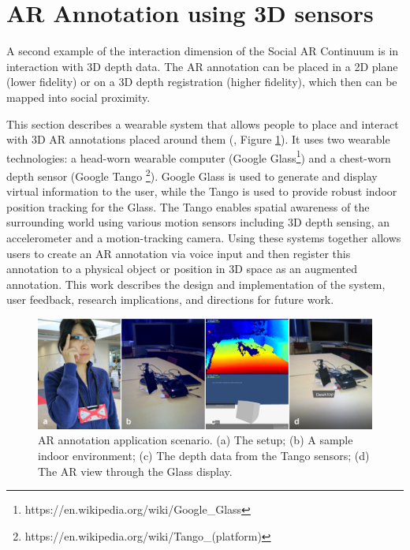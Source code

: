 \pagebreak
\section{AR Annotation using 3D sensors}
\label{sec:3D}

A second example of the interaction dimension of the Social AR Continuum is in interaction with 3D depth data. The AR annotation can be placed in a 2D plane (lower fidelity) or on a 3D depth registration (higher fidelity), which then can be mapped into social proximity. 

This section describes a wearable system that allows people to place and interact with 3D AR annotations placed around them (\cite{Nassani2015a, Nassani2015}, Figure \ref{fig:mgia15:teaser}). It uses two wearable technologies: a head-worn wearable computer (Google Glass\footnote{https://en.wikipedia.org/wiki/Google_Glass}) and a chest-worn depth sensor (Google Tango \footnote{https://en.wikipedia.org/wiki/Tango_(platform)}). Google Glass is used to generate and display virtual information to the user, while the Tango is used to provide robust indoor position tracking for the Glass. The Tango enables spatial awareness of the surrounding world using various motion sensors including 3D depth sensing, an accelerometer and a motion-tracking camera. Using these systems together allows users to create an AR annotation via voice input and then register this annotation to a physical object or position in 3D space as an augmented annotation. This work describes the design and implementation of the system, user feedback, research implications, and directions for future work.  

\begin{figure}[ht]
  \centering
  \includegraphics[width=\linewidth]{images/62-3d-mgia15/sampleteaser-01.jpg}
  \caption{AR annotation application scenario. (a) The setup; (b) A sample indoor environment; (c) The depth data from the Tango sensors; (d) The AR view through the Glass display.}
  \label{fig:mgia15:teaser}
\end{figure}

